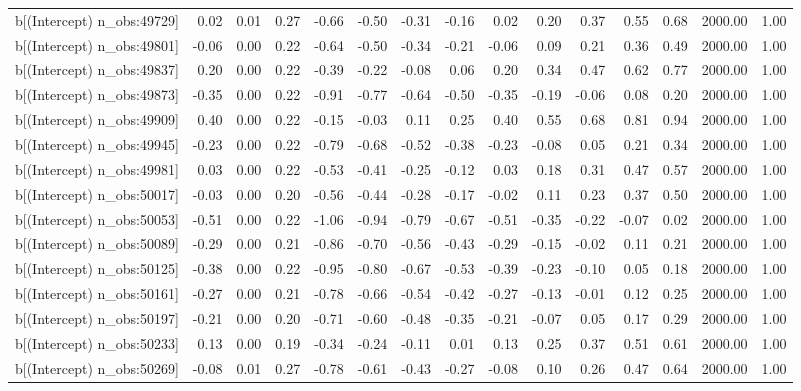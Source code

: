 \begin{table}[ht]
\begin{tabular}{rrrrrrrrrrrrrrr}
  b[(Intercept) n\_obs:49729] & 0.02 & 0.01 & 0.27 & -0.66 & -0.50 & -0.31 & -0.16 & 0.02 & 0.20 & 0.37 & 0.55 & 0.68 & 2000.00 & 1.00 \\ 
  b[(Intercept) n\_obs:49801] & -0.06 & 0.00 & 0.22 & -0.64 & -0.50 & -0.34 & -0.21 & -0.06 & 0.09 & 0.21 & 0.36 & 0.49 & 2000.00 & 1.00 \\ 
  b[(Intercept) n\_obs:49837] & 0.20 & 0.00 & 0.22 & -0.39 & -0.22 & -0.08 & 0.06 & 0.20 & 0.34 & 0.47 & 0.62 & 0.77 & 2000.00 & 1.00 \\ 
  b[(Intercept) n\_obs:49873] & -0.35 & 0.00 & 0.22 & -0.91 & -0.77 & -0.64 & -0.50 & -0.35 & -0.19 & -0.06 & 0.08 & 0.20 & 2000.00 & 1.00 \\ 
  b[(Intercept) n\_obs:49909] & 0.40 & 0.00 & 0.22 & -0.15 & -0.03 & 0.11 & 0.25 & 0.40 & 0.55 & 0.68 & 0.81 & 0.94 & 2000.00 & 1.00 \\ 
  b[(Intercept) n\_obs:49945] & -0.23 & 0.00 & 0.22 & -0.79 & -0.68 & -0.52 & -0.38 & -0.23 & -0.08 & 0.05 & 0.21 & 0.34 & 2000.00 & 1.00 \\ 
  b[(Intercept) n\_obs:49981] & 0.03 & 0.00 & 0.22 & -0.53 & -0.41 & -0.25 & -0.12 & 0.03 & 0.18 & 0.31 & 0.47 & 0.57 & 2000.00 & 1.00 \\ 
  b[(Intercept) n\_obs:50017] & -0.03 & 0.00 & 0.20 & -0.56 & -0.44 & -0.28 & -0.17 & -0.02 & 0.11 & 0.23 & 0.37 & 0.50 & 2000.00 & 1.00 \\ 
  b[(Intercept) n\_obs:50053] & -0.51 & 0.00 & 0.22 & -1.06 & -0.94 & -0.79 & -0.67 & -0.51 & -0.35 & -0.22 & -0.07 & 0.02 & 2000.00 & 1.00 \\ 
  b[(Intercept) n\_obs:50089] & -0.29 & 0.00 & 0.21 & -0.86 & -0.70 & -0.56 & -0.43 & -0.29 & -0.15 & -0.02 & 0.11 & 0.21 & 2000.00 & 1.00 \\ 
  b[(Intercept) n\_obs:50125] & -0.38 & 0.00 & 0.22 & -0.95 & -0.80 & -0.67 & -0.53 & -0.39 & -0.23 & -0.10 & 0.05 & 0.18 & 2000.00 & 1.00 \\ 
  b[(Intercept) n\_obs:50161] & -0.27 & 0.00 & 0.21 & -0.78 & -0.66 & -0.54 & -0.42 & -0.27 & -0.13 & -0.01 & 0.12 & 0.25 & 2000.00 & 1.00 \\ 
  b[(Intercept) n\_obs:50197] & -0.21 & 0.00 & 0.20 & -0.71 & -0.60 & -0.48 & -0.35 & -0.21 & -0.07 & 0.05 & 0.17 & 0.29 & 2000.00 & 1.00 \\ 
  b[(Intercept) n\_obs:50233] & 0.13 & 0.00 & 0.19 & -0.34 & -0.24 & -0.11 & 0.01 & 0.13 & 0.25 & 0.37 & 0.51 & 0.61 & 2000.00 & 1.00 \\ 
  b[(Intercept) n\_obs:50269] & -0.08 & 0.01 & 0.27 & -0.78 & -0.61 & -0.43 & -0.27 & -0.08 & 0.10 & 0.26 & 0.47 & 0.64 & 2000.00 & 1.00 \\ 

\end{tabular}
\end{table}
